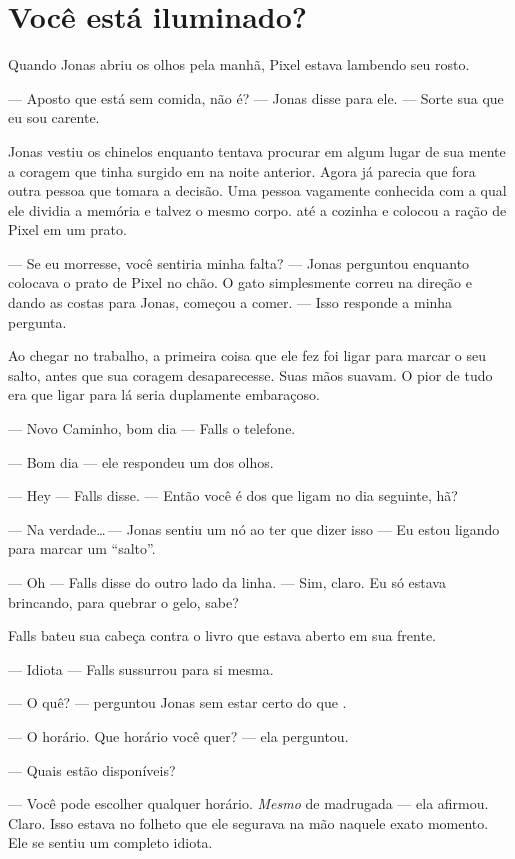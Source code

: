 \chapter{Você está iluminado?}

Quando Jonas abriu os olhos pela manhã, Pixel estava lambendo seu rosto.

--- Aposto que está sem comida, não é? --- Jonas disse para ele. --- Sorte sua que eu sou carente.

Jonas vestiu os chinelos enquanto tentava procurar em algum lugar de sua mente a coragem que tinha surgido em  na noite anterior. Agora já parecia que fora outra pessoa que tomara a decisão. Uma pessoa vagamente conhecida\mudanca{,} com a qual ele dividia a memória e talvez o mesmo corpo.  até a cozinha e colocou a ração de Pixel em um prato.

--- Se eu morresse, você sentiria minha falta? --- Jonas perguntou\mudanca{,} enquanto colocava o prato de Pixel no chão. O gato simplesmente correu na direção e\mudanca{,} dando as costas para Jonas, começou a comer. --- Isso responde a minha pergunta.

Ao chegar no trabalho, a primeira coisa que ele fez foi ligar para marcar o seu salto, antes que sua coragem desaparecesse. Suas mãos suavam. O pior de tudo era que ligar para lá seria duplamente embaraçoso.

--- Novo Caminho, bom dia --- Falls  o telefone.

--- Bom dia --- ele respondeu um dos olhos.

--- Hey --- Falls disse. --- Então você é dos que ligam no dia seguinte, hã?

--- Na verdade\ldots\,--- Jonas sentiu um nó ao ter que dizer isso --- Eu estou ligando para marcar um ``salto''.

--- Oh --- Falls disse do outro lado da linha. --- Sim, claro. Eu só estava brincando, para quebrar o gelo, sabe?

Falls bateu sua cabeça contra o livro que estava aberto em sua frente.

--- Idiota --- Falls sussurrou para si mesma.

--- O quê? --- perguntou Jonas\mudanca{,} sem estar certo do que .

--- O horário. Que horário você quer? --- ela perguntou.

--- Quais estão disponíveis?

--- Você pode escolher qualquer horário. \emph{Mesmo} de madrugada --- ela afirmou. Claro. Isso estava no folheto que ele segurava na mão naquele exato momento. Ele se sentiu um completo idiota.

